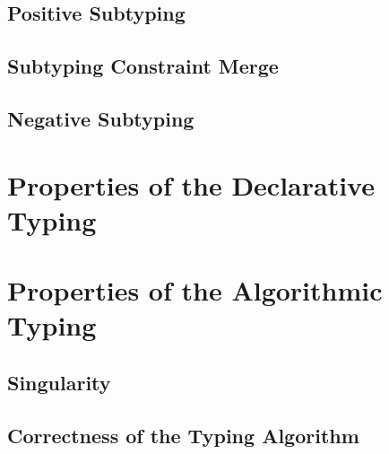 \documentclass[acmsmall,natbib=false,review,anonymous]{acmart}
\newcommand{\genDir}{_gen}
\begin{document}
\subsection{Positive Subtyping}


\subsection{Subtyping Constraint Merge}


\subsection{Negative Subtyping}




\section{Properties of the Declarative Typing}




\section{Properties of the Algorithmic Typing}

\subsection{Singularity}


\subsection{Correctness of the Typing Algorithm}


\printbibliography
\end{document}
